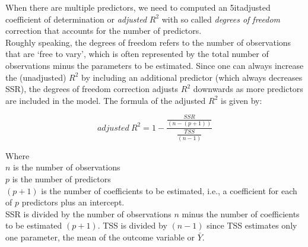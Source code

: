 \documentclass{article}
\begin{document}
    \noindent When there are multiple predictors, we need to computed an \tex
5it{adjusted coefficient of determination} or \textit{adjusted} $R^2$ with
so called \textit{degrees of freedom} correction that accounts for the number of predictors.\\

    \noindent Roughly speaking, the degrees of freedom refers to the number
of observations that are `free to vary', which is often represented by the
total number of observations minus the parameters to be estimated. Since one
can always increase the (unadjusted) $R^2$ by including an additional
predictor (which always decreases SSR), the degrees of freedom correction
adjusts $R^2$ downwards as more predictors are included in the model. The
formula of the adjusted $R^2$ is given by:

    \[
        adjusted \ R^2 = 1 - \frac{\frac{SSR}{(n-(p+1))}}{\frac{TSS}{(n-1)}}
    \]

    \indent Where\\
    \indent \indent $n$ is the number of observations\\
    \indent \indent $p$ is the number of predictors\\
    \indent \indent $(p+1)$ is the number of coefficients to be estimated,
i.e., a coefficient for each of $p$ predictors plus an intercept.\\

    \noindent SSR is divided by the number of observations $n$ minus the
number of coefficients to be estimated $(p+1)$. TSS is divided by $(n-1)$
since TSS estimates only one parameter, the mean of the outcome variable or $\bar{Y}$.
\end{document}
